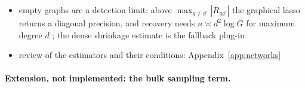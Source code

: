 \documentclass[pdflatex, sn-nature]{sn-jnl}
\theoremstyle{thmstyleone}%
\theoremstyle{thmstyletwo}%
\theoremstyle{thmstylethree}%
\begin{document}
\begin{itemize}
        lasso) is inverted once per type, before any fit, through its Cholesky factor
        \cite{golubMatrixComputations2013}: the factorisation certifies that \(\hat{\boldsymbol{\Omega}}_{j}\) is positive definite,
        the inverse is exactly symmetric, at least as accurate as a QR inverse and three to five times faster for
        \(G=200\) to \(800\); if the factorisation fails, the diagonal of \(\hat{\boldsymbol{\Omega}}_{j}\) is shifted uniformly, which
        keeps the graph, until both factors exist; the graphical lasso
        returns \(\hat{\boldsymbol{\Sigma}}_{j}\) directly; this \(O(G^{3})\) inversion is paid once, whereas the mixture covariance
        is factorised at every likelihood evaluation (Appendix~\ref{app:optim-structured})
  \item empty graphs are a detection limit: above \(\max_{g\neq g'}|R_{gg'}|\) the graphical lasso returns a
        diagonal precision, and recovery needs \(n\asymp d^{2}\log G\) for maximum degree \(d\)
        \cite{chiquetContributionsSparseMethods2015,heinävaaraInconsistencyℓ1penalisedSparse2016};
        the dense shrinkage estimate is the fallback plug-in
  \item review of the estimators and their conditions: Appendix~\ref{app:networks}
\end{itemize}

\paragraph{Extension, not implemented: the bulk sampling term.}
\end{document}
